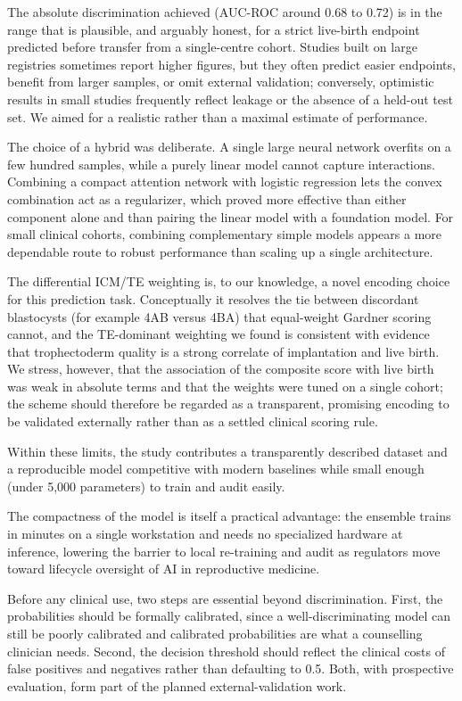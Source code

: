 \documentclass[12pt,a4paper]{article}
\begin{document}
The absolute discrimination achieved (AUC-ROC around 0.68 to 0.72) is in the range that is plausible, and arguably honest, for a strict live-birth endpoint predicted before transfer from a single-centre cohort. Studies built on large registries sometimes report higher figures,\cite{goyal,huang} but they often predict easier endpoints, benefit from larger samples, or omit external validation; conversely, optimistic results in small studies frequently reflect leakage or the absence of a held-out test set. We aimed for a realistic rather than a maximal estimate of performance.

The choice of a hybrid was deliberate. A single large neural network overfits on a few hundred samples, while a purely linear model cannot capture interactions. Combining a compact attention network with logistic regression lets the convex combination act as a regularizer, which proved more effective than either component alone and than pairing the linear model with a foundation model. For small clinical cohorts, combining complementary simple models appears a more dependable route to robust performance than scaling up a single architecture.

The differential ICM/TE weighting is, to our knowledge, a novel encoding choice for this prediction task. Conceptually it resolves the tie between discordant blastocysts (for example 4AB versus 4BA) that equal-weight Gardner scoring cannot, and the TE-dominant weighting we found is consistent with evidence that trophectoderm quality is a strong correlate of implantation and live birth. We stress, however, that the association of the composite score with live birth was weak in absolute terms and that the weights were tuned on a single cohort; the scheme should therefore be regarded as a transparent, promising encoding to be validated externally rather than as a settled clinical scoring rule.

Within these limits, the study contributes a transparently described dataset and a reproducible model competitive with modern baselines while small enough (under 5,000 parameters) to train and audit easily.\cite{tripod,probast}

The compactness of the model is itself a practical advantage: the ensemble trains in minutes on a single workstation and needs no specialized hardware at inference, lowering the barrier to local re-training and audit as regulators move toward lifecycle oversight of AI in reproductive medicine.\cite{medenica,guell}

Before any clinical use, two steps are essential beyond discrimination. First, the probabilities should be formally calibrated, since a well-discriminating model can still be poorly calibrated and calibrated probabilities are what a counselling clinician needs. Second, the decision threshold should reflect the clinical costs of false positives and negatives rather than defaulting to 0.5. Both, with prospective evaluation, form part of the planned external-validation work.
\end{document}
